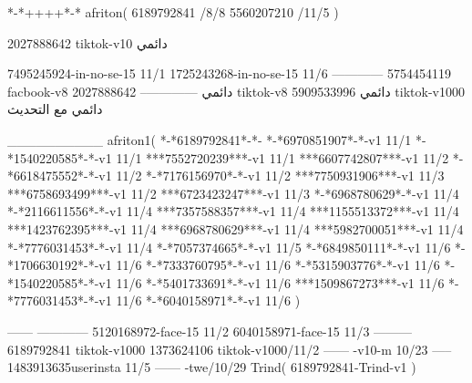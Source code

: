 *-*++++*-*
afriton(
6189792841 /8/8
5560207210 /11/5
)

2027888642 tiktok-v10
دائمي


7495245924-in-no-se-15 11/1
1725243268-in-no-se-15 11/6
------------
5754454119 facbook-v8
دائمي
--------------
2027888642 tiktok-v8
دائمي
5909533996 tiktok-v1000
دائمي مع التحديث

__________
afriton1(
*-*6189792841*-*-
*-*6970851907*-*-v1 11/1
*-*1540220585*-*-v1 11/1
***7552720239***-v1 11/1
***6607742807***-v1 11/2
*-*6618475552*-*-v1 11/2
*-*7176156970*-*-v1 11/2
***7750931906***-v1 11/3
***6758693499***-v1 11/2
***6723423247***-v1 11/3
*-*6968780629*-*-v1 11/4
*-*2116611556*-*-v1 11/4
***7357588357***-v1 11/4
***1155513372***-v1 11/4
***1423762395***-v1 11/4
***6968780629***-v1 11/4
***5982700051***-v1 11/4
*-*7776031453*-*-v1 11/4
*-*7057374665*-*-v1 11/5
*-*6849850111*-*-v1 11/6
*-*1706630192*-*-v1 11/6
*-*7333760795*-*-v1 11/6
*-*5315903776*-*-v1 11/6
*-*1540220585*-*-v1 11/6
*-*5401733691*-*-v1 11/6
***1509867273***-v1 11/6
*-*7776031453*-*-v1 11/6
*-*6040158971*-*-v1 11/6
)

------
------------
5120168972-face-15 11/2
6040158971-face-15 11/3
---------
6189792841 tiktok-v1000
1373624106 tiktok-v1000/11/2
------
-v10-m 10/23
-----
1483913635userinsta 11/5
------
-twe/10/29
Trind(
6189792841-Trind-v1 
)
